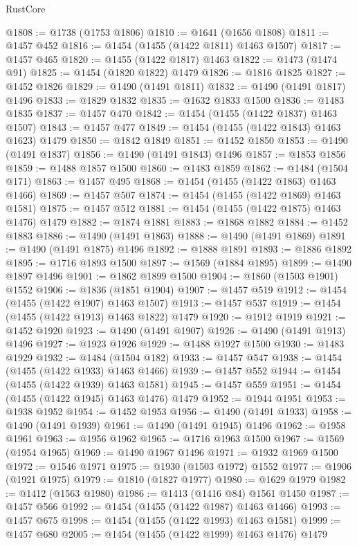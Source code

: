 \begin{lexlean}{RustCore}
\begin{coremodule}
@1808 := @1738 (@1753 @1806)
@1810 := @1641 (@1656 @1808)
@1811 := @1457 @452
@1816 := @1454 (@1455 (@1422 @1811) @1463 @1507)
@1817 := @1457 @465
@1820 := @1455 (@1422 @1817) @1463
@1822 := @1473 (@1474 @91)
@1825 := @1454 (@1820 @1822) @1479
@1826 := @1816 @1825
@1827 := @1452 @1826
@1829 := @1490 (@1491 @1811)
@1832 := @1490 (@1491 @1817) @1496
@1833 := @1829 @1832
@1835 := @1632 @1833 @1500
@1836 := @1483 @1835
@1837 := @1457 @470
@1842 := @1454 (@1455 (@1422 @1837) @1463 @1507)
@1843 := @1457 @477
@1849 := @1454 (@1455 (@1422 @1843) @1463 @1623) @1479
@1850 := @1842 @1849
@1851 := @1452 @1850
@1853 := @1490 (@1491 @1837)
@1856 := @1490 (@1491 @1843) @1496
@1857 := @1853 @1856
@1859 := @1488 @1857 @1500
@1860 := @1483 @1859
@1862 := @1484 (@1504 @171)
@1863 := @1457 @495
@1868 := @1454 (@1455 (@1422 @1863) @1463 @1466)
@1869 := @1457 @507
@1874 := @1454 (@1455 (@1422 @1869) @1463 @1581)
@1875 := @1457 @512
@1881 := @1454 (@1455 (@1422 @1875) @1463 @1476) @1479
@1882 := @1874 @1881
@1883 := @1868 @1882
@1884 := @1452 @1883
@1886 := @1490 (@1491 @1863)
@1888 := @1490 (@1491 @1869)
@1891 := @1490 (@1491 @1875) @1496
@1892 := @1888 @1891
@1893 := @1886 @1892
@1895 := @1716 @1893 @1500
@1897 := @1569 (@1884 @1895)
@1899 := @1490 @1897 @1496
@1901 := @1862 @1899 @1500
@1904 := @1860 (@1503 @1901) @1552
@1906 := @1836 (@1851 @1904)
@1907 := @1457 @519
@1912 := @1454 (@1455 (@1422 @1907) @1463 @1507)
@1913 := @1457 @537
@1919 := @1454 (@1455 (@1422 @1913) @1463 @1822) @1479
@1920 := @1912 @1919
@1921 := @1452 @1920
@1923 := @1490 (@1491 @1907)
@1926 := @1490 (@1491 @1913) @1496
@1927 := @1923 @1926
@1929 := @1488 @1927 @1500
@1930 := @1483 @1929
@1932 := @1484 (@1504 @182)
@1933 := @1457 @547
@1938 := @1454 (@1455 (@1422 @1933) @1463 @1466)
@1939 := @1457 @552
@1944 := @1454 (@1455 (@1422 @1939) @1463 @1581)
@1945 := @1457 @559
@1951 := @1454 (@1455 (@1422 @1945) @1463 @1476) @1479
@1952 := @1944 @1951
@1953 := @1938 @1952
@1954 := @1452 @1953
@1956 := @1490 (@1491 @1933)
@1958 := @1490 (@1491 @1939)
@1961 := @1490 (@1491 @1945) @1496
@1962 := @1958 @1961
@1963 := @1956 @1962
@1965 := @1716 @1963 @1500
@1967 := @1569 (@1954 @1965)
@1969 := @1490 @1967 @1496
@1971 := @1932 @1969 @1500
@1972 := @1546 @1971
@1975 := @1930 (@1503 @1972) @1552
@1977 := @1906 (@1921 @1975)
@1979 := @1810 (@1827 @1977)
@1980 := @1629 @1979
@1982 := @1412 (@1563 @1980)
@1986 := @1413 (@1416 @84) @1561 @1450
@1987 := @1457 @566
@1992 := @1454 (@1455 (@1422 @1987) @1463 @1466)
@1993 := @1457 @675
@1998 := @1454 (@1455 (@1422 @1993) @1463 @1581)
@1999 := @1457 @680
@2005 := @1454 (@1455 (@1422 @1999) @1463 @1476) @1479

\end{coremodule}
\end{lexlean}
